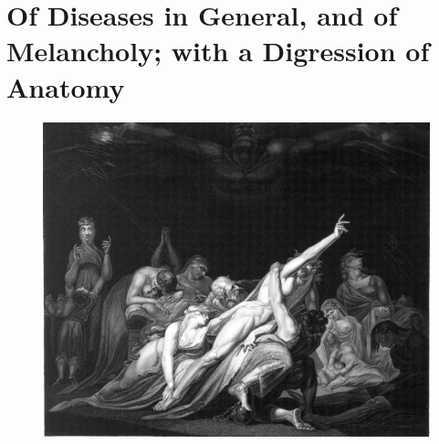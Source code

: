 \chapter[Of Diseases and Melancholy]{Of Diseases in General, and of Melancholy; with a Digression of Anatomy}
\begin{figure}[H]
  \centering
  \includegraphics[keepaspectratio,width=\textwidth]{figures/v7cfk63b-small.jpg}
  \caption{}
  \label{fig:deathlooms}
\end{figure}
